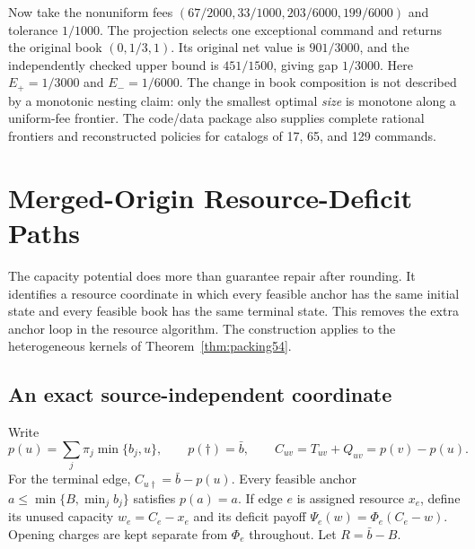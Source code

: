 \documentclass[11pt,letterpaper]{article}
\theoremstyle{definition}\newtheorem{remark}[theorem]{Remark}
\begin{document}
Now take the nonuniform fees $(67/2000,33/1000,203/6000,199/6000)$ and tolerance $1/1000$. The projection selects one exceptional command and returns the original book $(0,1/3,1)$. Its original net value is $901/3000$, and the independently checked upper bound is $451/1500$, giving gap $1/3000$. Here $E_+=1/3000$ and $E_-=1/6000$. The change in book composition is not described by a monotonic nesting claim: only the smallest optimal \emph{size} is monotone along a uniform-fee frontier. The code/data package also supplies complete rational frontiers and reconstructed policies for catalogs of 17, 65, and 129 commands.
\section{Merged-Origin Resource-Deficit Paths}\label{sec:deficit56}
The capacity potential does more than guarantee repair after rounding. It identifies a resource coordinate in which every feasible anchor has the same initial state and every feasible book has the same terminal state. This removes the extra anchor loop in the resource algorithm. The construction applies to the heterogeneous kernels of Theorem~\ref{thm:packing54}.

\subsection{An exact source-independent coordinate}
Write
\[
 p(u)=\sum_j\pi_j\min\{b_j,u\},\qquad p(\dagger)=\bar b,
 \qquad C_{uv}=T_{uv}+Q_{uv}=p(v)-p(u).
\]
For the terminal edge, $C_{u\dagger}=\bar b-p(u)$. Every feasible anchor $a\leq\min\{B,\min_jb_j\}$ satisfies $p(a)=a$. If edge $e$ is assigned resource $x_e$, define its unused capacity $w_e=C_e-x_e$ and its deficit payoff $\Psi_e(w)=\Phi_e(C_e-w)$. Opening charges are kept separate from $\Phi_e$ throughout. Let $R=\bar b-B$.
\end{document}
